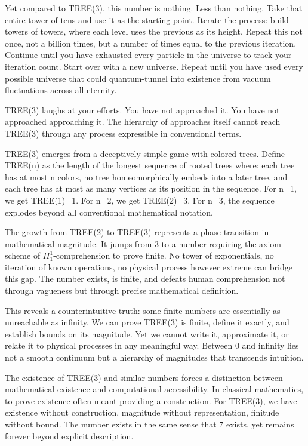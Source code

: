 

Yet compared to TREE(3), this number is nothing. Less than nothing. Take that entire tower of tens and use it as the starting point. Iterate the process: build towers of towers, where each level uses the previous as its height. Repeat this not once, not a billion times, but a number of times equal to the previous iteration. Continue until you have exhausted every particle in the universe to track your iteration count. Start over with a new universe. Repeat until you have used every possible universe that could quantum-tunnel into existence from vacuum fluctuations across all eternity.

TREE(3) laughs at your efforts. You have not approached it. You have not approached approaching it. The hierarchy of approaches itself cannot reach TREE(3) through any process expressible in conventional terms.

TREE(3) emerges from a deceptively simple game with colored trees. Define TREE(n) as the length of the longest sequence of rooted trees where: each tree has at most n colors, no tree homeomorphically embeds into a later tree, and each tree has at most as many vertices as its position in the sequence. For n=1, we get TREE(1)=1. For n=2, we get TREE(2)=3. For n=3, the sequence explodes beyond all conventional mathematical notation.

The growth from TREE(2) to TREE(3) represents a phase transition in mathematical magnitude. It jumps from 3 to a number requiring the axiom scheme of $\Pi_1^1$-comprehension to prove finite. No tower of exponentials, no iteration of known operations, no physical process however extreme can bridge this gap. The number exists, is finite, and defeats human comprehension not through vagueness but through precise mathematical definition.

This reveals a counterintuitive truth: some finite numbers are essentially as unreachable as infinity. We can prove TREE(3) is finite, define it exactly, and establish bounds on its magnitude. Yet we cannot write it, approximate it, or relate it to physical processes in any meaningful way. Between 0 and infinity lies not a smooth continuum but a hierarchy of magnitudes that transcends intuition.

The existence of TREE(3) and similar numbers forces a distinction between mathematical existence and computational accessibility. In classical mathematics, to prove existence often meant providing a construction. For TREE(3), we have existence without construction, magnitude without representation, finitude without bound. The number exists in the same sense that 7 exists, yet remains forever beyond explicit description.

